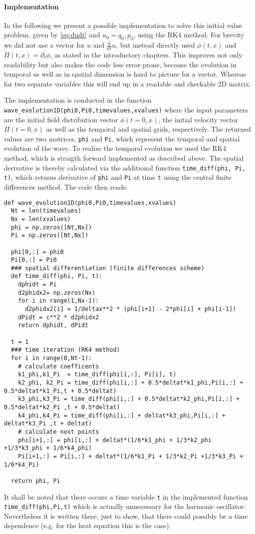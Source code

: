 \paragraph{Implementation}
In the following we present a possible implementation to solve this initial value problem, given by \ref{eq:dudt} and $u_0 = {q_0, p_0}$, using the RK4 method.
For brevity we did not use a vector for $u$ and $\tfrac{\mathrm{d}}{\mathrm{d}t} u$, but instead directly used $\phi(t,x)$ and $\Pi(t,x) = \partial_t \phi$, as stated in the introductory chapters. This improves not only readability but also makes the code less error-prone, because the evolution in temporal as well as in spatial dimension is hard to picture for a vector. Whereas for two separate variables this will end up in a readable and checkable 2D matrix.

The implementation is conducted in the function \lstinline{wave_evolution1D(phi0,Pi0,timevalues,xvalues)} where the input parameters are the initial field distribution vector $\phi(t=0,x)$, the initial velocity vector $\Pi(t=0,x)$ as well as the temporal and spatial grids, respectively.
The returned values are two matrices, \lstinline{phi} and \lstinline{Pi}, which represent the temporal and spatial evolution of the wave.
To realize the temporal evolution we used the RK4 method, which is straigth forward implemented as described above. The spatial derivative is thereby calculated via the additional function \lstinline{time_diff(phi, Pi, t)}, which returns derivative of \lstinline{phi} and \lstinline{Pi} at time \lstinline{t} using the central finite differences method.
The code then reads:
\begin{lstlisting}
def wave_evolution1D(phi0,Pi0,timevalues,xvalues)
  Nt = len(timevalues)
  Nx = len(xvalues)
  phi = np.zeros([Nt,Nx])
  Pi = np.zeros([Nt,Nx])

  phi[0,:] = phi0
  Pi[0,:] = Pi0
  ### spatial differentiation (finite differences scheme)
  def time_diff(phi, Pi, t):
    dphidt = Pi
    d2phidx2= np.zeros(Nx)
    for i in range(1,Nx-1):
      d2phidx2[i] = 1/deltax**2 * (phi[i+1] - 2*phi[i] + phi[i-1])
    dPidt = c**2 * d2phidx2
    return dphidt, dPidt

  t = 1
  ### time iteration (RK4 method)
  for i in range(0,Nt-1):
    # calculate coefficents
    k1_phi,k1_Pi  = time_diff(phi[i,:], Pi[i], t)
    k2_phi, k2_Pi = time_diff(phi[i,:] + 0.5*deltat*k1_phi,Pi[i,:] + 0.5*deltat*k1_Pi,t + 0.5*deltat)
    k3_phi,k3_Pi = time_diff(phi[i,:] + 0.5*deltat*k2_phi,Pi[i,:] + 0.5*deltat*k2_Pi ,t + 0.5*deltat)
    k4_phi,k4_Pi = time_diff(phi[i,:] + deltat*k3_phi,Pi[i,:] + deltat*k3_Pi ,t + deltat)
    # calculate next points
    phi[i+1,:] = phi[i,:] + deltat*(1/6*k1_phi + 1/3*k2_phi +1/3*k3_phi + 1/6*k4_phi)
    Pi[i+1,:] = Pi[i,:] + deltat*(1/6*k1_Pi + 1/3*k2_Pi +1/3*k3_Pi + 1/6*k4_Pi)

  return phi, Pi
\end{lstlisting}
It shall be noted that there occurs a time variable \lstinline{t} in the implemented function \lstinline{time_diff(phi,Pi,t)} which is actually unnecessary for the harmonic oscillator. Nevertheless it is written there, just to show, that there could possibly be a time dependence (e.g. for the heat equation this is the case).

